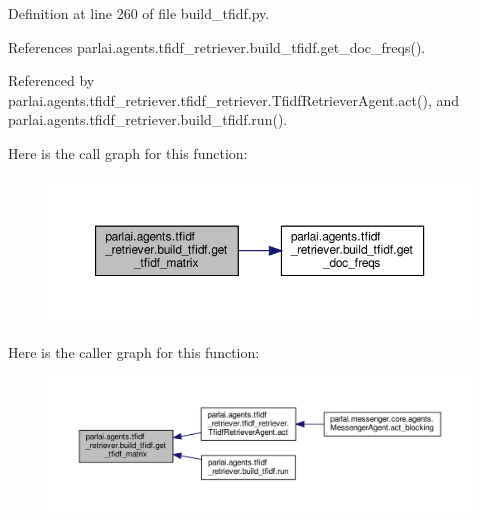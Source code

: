 Definition at line 260 of file build\+\_\+tfidf.\+py.



References parlai.\+agents.\+tfidf\+\_\+retriever.\+build\+\_\+tfidf.\+get\+\_\+doc\+\_\+freqs().



Referenced by parlai.\+agents.\+tfidf\+\_\+retriever.\+tfidf\+\_\+retriever.\+Tfidf\+Retriever\+Agent.\+act(), and parlai.\+agents.\+tfidf\+\_\+retriever.\+build\+\_\+tfidf.\+run().

Here is the call graph for this function\+:
\nopagebreak
\begin{figure}[H]
\begin{center}
\leavevmode
\includegraphics[width=350pt]{namespaceparlai_1_1agents_1_1tfidf__retriever_1_1build__tfidf_acce651a5b40c5a3b4009181f22c69eaa_cgraph}
\end{center}
\end{figure}
Here is the caller graph for this function\+:
\nopagebreak
\begin{figure}[H]
\begin{center}
\leavevmode
\includegraphics[width=350pt]{namespaceparlai_1_1agents_1_1tfidf__retriever_1_1build__tfidf_acce651a5b40c5a3b4009181f22c69eaa_icgraph}
\end{center}
\end{figure}
\mbox{\label{namespaceparlai_1_1agents_1_1tfidf__retriever_1_1build__tfidf_a3cd67edc9bfd76a8eeb49add2de75019}} 
